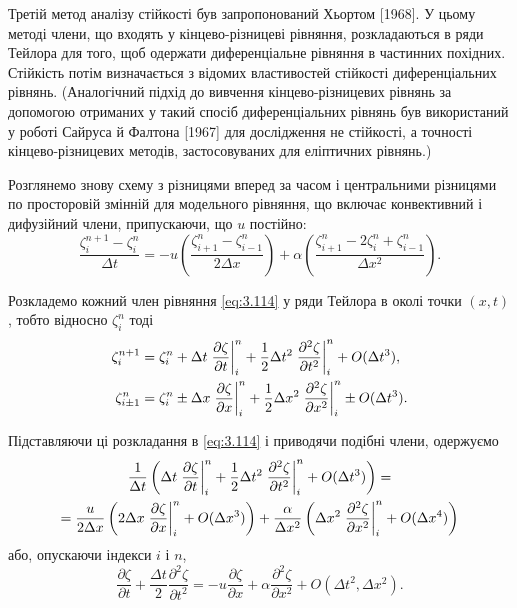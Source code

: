 Третій метод аналізу стійкості був запропонований Хьортом [1968]. У цьому методі члени, що входять у кінцево-різницеві рівняння, розкладаються в ряди Тейлора для того, щоб одержати диференціальне рівняння в частинних похідних. Стійкість потім визначається з відомих властивостей стійкості диференціальних рівнянь. (Аналогічний підхід до вивчення кінцево-різницевих рівнянь за допомогою отриманих у такий спосіб диференціальних рівнянь був використаний у роботі Сайруса й Фалтона [1967] для дослідження не стійкості, а точності кінцево-різницевих методів, застосовуваних для еліптичних рівнянь.) \medskip

Розглянемо знову схему з різницями вперед за часом і центральними різницями по просторовій змінній для модельного рівняння, що включає конвективний і дифузійний члени, припускаючи, що $u$ постійно:
\begin{equation}
    \label{eq:3.114}
    \frac{\zeta_i^{n + 1} - \zeta_i^n}{\Delta t} = -u\left(\frac{\zeta_{i + 1}^n - \zeta_{i - 1}^n}{2\Delta x}\right) + \alpha \left( \frac{\zeta_{i + 1}^n - 2 \zeta_i^n + \zeta_{i - 1}^n}{\Delta x^2}\right).
\end{equation}

Розкладемо кожний член рівняння \eqref{eq:3.114} у ряди Тейлора в околі точки $(x, t)$, тобто відносно $\zeta_i^n$ тоді
\begin{align}
    \label{eq:3.115}
    \zeta_i^{n + 1} &= \zeta_i^n + \Delta t \left. \frac{\partial \zeta}{\partial t} \right|_i^n  + \frac{1}{2} \Delta t^2 \left. \frac{\partial^2 \zeta}{\partial t^2} \right|_i^n + O(\Delta t^3), \\
    \label{eq:3.116}    
    \zeta_{i \pm 1}^n &= \zeta_i^n \pm \Delta x \left. \frac{\partial \zeta}{\partial x} \right|_i^n  + \frac{1}{2} \Delta x^2 \left. \frac{\partial^2 \zeta}{\partial x^2} \right|_i^n \pm O(\Delta t^3).
\end{align}

Підставляючи ці розкладання в \eqref{eq:3.114} і приводячи подібні члени, одержуємо
\begin{multline}
    \label{eq:3.117}
    \frac{1}{\Delta t} \left( \Delta t \left. \frac{\partial \zeta}{\partial t} \right|_i^n + \frac{1}{2} \Delta t^2 \left. \frac{\partial^2 \zeta}{\partial t^2} \right|_i^n + O(\Delta t^3) \right) = \\ = \frac{u}{2\Delta x} \left( 2 \Delta x \left. \frac{\partial \zeta}{\partial x} \right|_i^n + O(\Delta x^3) \right) + \frac{\alpha}{\Delta x^2} \left( \Delta x^2 \left. \frac{\partial^2 \zeta}{\partial x^2} \right|_i^n + O(\Delta x^4) \right)
\end{multline}
або, опускаючи індекси $i$ і $n$,
\begin{equation}
    \label{eq:3.118}
    \frac{\partial \zeta}{\partial t} + \frac{\Delta t}{2} \frac{\partial^2 \zeta}{\partial t^2} = - u \frac{\partial \zeta}{\partial x} + \alpha \frac{\partial^2 \zeta}{\partial x^2} + O(\Delta t^2, \Delta x^2).
\end{equation}

